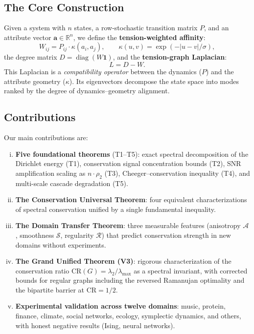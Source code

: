 \documentclass[12pt,letterpaper]{article}
\newcommand{\R}{\mathbb{R}}
\newcommand{\One}{\mathbf{1}}
\newcommand{\bfa}{\mathbf{a}}
\newcommand{\CR}{\mathrm{CR}}
\newcommand{\diag}{\operatorname{diag}}
\newcommand{\cA}{\mathcal{A}}
\newcommand{\cS}{\mathcal{S}}
\newcommand{\cR}{\mathcal{R}}
\begin{document}
\subsection{The Core Construction}

Given a system with $n$ states, a row-stochastic transition matrix $P$, and an attribute vector $\bfa \in \R^n$, we define the \textbf{tension-weighted affinity}:
\begin{equation}
\label{eq:tension-weight}
  W_{ij} = P_{ij} \cdot \kappa(a_i, a_j), \qquad \kappa(u,v) = \exp(-|u - v|/\sigma),
\end{equation}
the degree matrix $D = \diag(W\One)$, and the \textbf{tension-graph Laplacian}:
\begin{equation}
\label{eq:tension-laplacian}
  L = D - W.
\end{equation}
This Laplacian is a \emph{compatibility operator} between the dynamics ($P$) and the attribute geometry ($\kappa$). Its eigenvectors decompose the state space into modes ranked by the degree of dynamics--geometry alignment.

\subsection{Contributions}

Our main contributions are:
\begin{enumerate}[(i)]
  \item \textbf{Five foundational theorems} (T1--T5): exact spectral decomposition of the Dirichlet energy (T1), conservation signal concentration bounds (T2), SNR amplification scaling as $n \cdot \rho_2$ (T3), Cheeger--conservation inequality (T4), and multi-scale cascade degradation (T5).
  \item \textbf{The Conservation Universal Theorem}: four equivalent characterizations of spectral conservation unified by a single fundamental inequality.
  \item \textbf{The Domain Transfer Theorem}: three measurable features (anisotropy $\cA$, smoothness $\cS$, regularity $\cR$) that predict conservation strength in new domains without experiments.
  \item \textbf{The Grand Unified Theorem (V3)}: rigorous characterization of the conservation ratio $\CR(G) = \lambda_2/\lambda_{\max}$ as a spectral invariant, with corrected bounds for regular graphs including the reversed Ramanujan optimality and the bipartite barrier at $\CR = 1/2$.
  \item \textbf{Experimental validation across twelve domains}: music, protein, finance, climate, social networks, ecology, symplectic dynamics, and others, with honest negative results (Ising, neural networks).
\end{enumerate}
\end{document}
